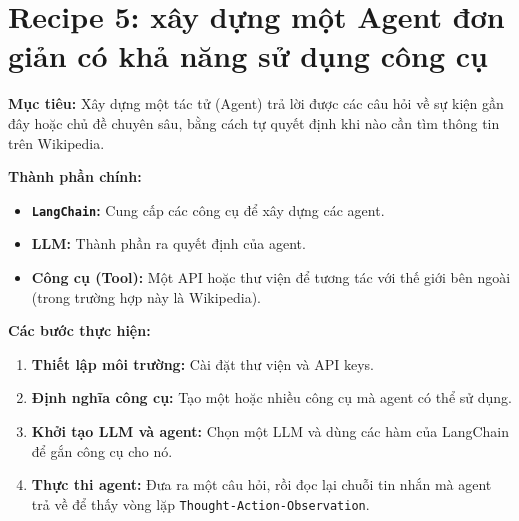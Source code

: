 
\section{Recipe 5: xây dựng một Agent đơn giản có khả năng sử dụng công cụ}
\label{sec:recipe_agent}

\textbf{Mục tiêu:} Xây dựng một tác tử (Agent) trả lời được các câu hỏi về sự kiện gần đây hoặc chủ đề chuyên sâu, bằng cách tự quyết định khi nào cần tìm thông tin trên Wikipedia.

\textbf{Thành phần chính:}
\begin{itemize}
    \item \textbf{\texttt{LangChain}:} Cung cấp các công cụ để xây dựng các agent.
    \item \textbf{LLM:} Thành phần ra quyết định của agent.
    \item \textbf{Công cụ (Tool):} Một API hoặc thư viện để tương tác với thế giới bên ngoài (trong trường hợp này là Wikipedia).
\end{itemize}

\textbf{Các bước thực hiện:}
\begin{enumerate}
    \item \textbf{Thiết lập môi trường:} Cài đặt thư viện và API keys.
    \item \textbf{Định nghĩa công cụ:} Tạo một hoặc nhiều công cụ mà agent có thể sử dụng.
    \item \textbf{Khởi tạo LLM và agent:} Chọn một LLM và dùng các hàm của LangChain để gắn công cụ cho nó.
    \item \textbf{Thực thi agent:} Đưa ra một câu hỏi, rồi đọc lại chuỗi tin nhắn mà agent trả về để thấy vòng lặp \texttt{Thought-\allowbreak Action-\allowbreak Observation}.
\end{enumerate}

